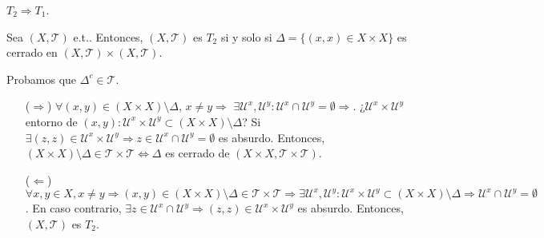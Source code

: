 \begin{obs}
  $T_{2} \Rightarrow T_{1}$.
\end{obs}

\begin{prop}
  Sea $ ( X, \mathcal{T} )$ e.t.. Entonces, $( X, \mathcal{T} )$ es $T_{2}$ si y solo si $ \Delta = \{  (x,x) \in X \times X \}$ es cerrado en $( X, \mathcal{T} ) \times ( X, \mathcal{T} )$.
\end{prop}

\begin{dem}
  Probamos que $\Delta^c \in \mathcal{T}$.
  \begin{enumerate}[label=(\roman*)]
    \item [($\Rightarrow$)] $\forall (x,y) \in (X \times X) \setminus \Delta$, $x \neq y \Rightarrow$ $\exists \mathcal{U}^{x}, \mathcal{U}^{y}: \mathcal{U}^{x} \cap \mathcal{U}^{y} = \emptyset \Rightarrow$. ¿$\mathcal{U}^{x} \times \mathcal{U}^{y}$ entorno de $(x,y): \mathcal{U}^{x} \times \mathcal{U}^{y} \subset (X \times X) \setminus \Delta$? Si $\exists (z,z) \in \mathcal{U}^{x} \times \mathcal{U}^{y} \Rightarrow z \in \mathcal{U}^{x} \cap \mathcal{U}^{y} = \emptyset$ es absurdo. Entonces, $(X \times X) \setminus \Delta \in \mathcal{T} \times \mathcal{T} \Leftrightarrow \Delta$ es cerrado de $(X \times X, \mathcal{T} \times \mathcal{T})$.
    \item [($\Leftarrow$)] $\forall x,y \in X, x \neq y \Rightarrow (x, y) \in (X \times X) \setminus \Delta \in \mathcal{T} \times \mathcal{T} \Rightarrow \exists \mathcal{U}^{x}, \mathcal{U}^{y} : \mathcal{U}^{x} \times \mathcal{U}^{y} \subset (X \times X) \setminus \Delta \Rightarrow \mathcal{U}^{x} \cap \mathcal{U}^{y} = \emptyset$. En caso contrario, $\exists z \in \mathcal{U}^{x} \cap \mathcal{U}^{y} \Rightarrow (z, z) \in \mathcal{U}^{x} \times \mathcal{U}^{y}$ es absurdo. Entonces, $( X, \mathcal{T} )$ es $T_{2}$.
  \end{enumerate}
\end{dem}

